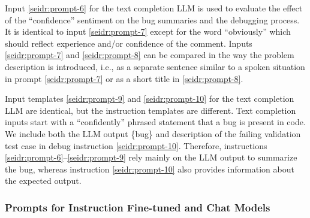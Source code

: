 Input \ref{seidr:prompt-6} for the text completion LLM is used to evaluate the effect of the ``confidence'' sentiment on the bug summaries and the debugging process. 
It is identical to input \ref{seidr:prompt-7} except for the word ``obviously'' which should reflect experience and/or confidence of the comment. 
Inputs \ref{seidr:prompt-7} and \ref{seidr:prompt-8} can be compared in the way the problem description is introduced, i.e., as a separate sentence similar to a spoken situation in prompt \ref{seidr:prompt-7} or as a short title in \ref{seidr:prompt-8}.

Input templates \ref{seidr:prompt-9} and \ref{seidr:prompt-10} for the text completion LLM are identical, but the instruction templates are different.
Text completion inputs start with a ``confidently'' phrased statement that a bug is present in code.  
We include both the LLM output \{bug\} and description of the failing validation test case in debug instruction \ref{seidr:prompt-10}.
Therefore, instructions \ref{seidr:prompt-6}--\ref{seidr:prompt-9} rely mainly on the LLM output to summarize the bug, whereas instruction \ref{seidr:prompt-10} also provides information about the expected output. 

\subsubsection{Prompts for Instruction Fine-tuned and Chat Models}
\label{sec:seidr-ollama-prompts}


